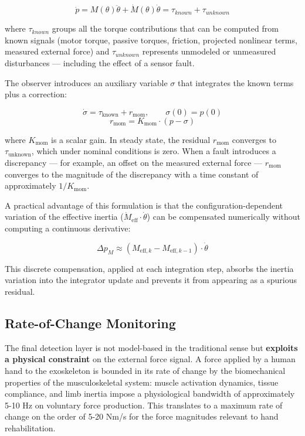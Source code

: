 \begin{equation}
    \dot{p} = M(\theta) \ddot{\theta} + \dot{M}(\theta) \dot{\theta} = \tau_{known} + \tau_{unknown}
\end{equation}

where $\tau_{known}$ groups all the torque contributions that can be computed from known signals (motor torque, passive torques, friction, projected nonlinear terms, measured external force) and $\tau_{unknown}$ represents unmodeled or unmeasured disturbances — including the effect of a sensor fault.

The observer introduces an auxiliary variable $\sigma$ that integrates the known terms plus a correction:

\begin{equation}
    \dot{\sigma} = \tau_{\text{known}} + r_{\text{mom}}, \qquad \sigma(0) = p(0)
\end{equation}
\begin{equation}
    r_{\text{mom}} = K_{\text{mom}} \cdot (p - \sigma)
\end{equation}

where $K_{\text{mom}}$ is a scalar gain. In steady state, the residual $r_{\text{mom}}$ converges to $\tau_{\text{unknown}}$, which under nominal conditions is zero. When a fault introduces a discrepancy — for example, an offset on the measured external force — $r_{\text{mom}}$ converges to the magnitude of the discrepancy with a time constant of approximately $1/K_{\text{mom}}$.

A practical advantage of this formulation is that the configuration-dependent variation of the effective inertia ($\dot{M}_{\text{eff}} \cdot \dot{\theta}$) can be compensated numerically without computing a continuous derivative:

\begin{equation}
    \Delta p_M \approx (M_{\text{eff},k} - M_{\text{eff},k-1}) \cdot \dot{\theta}
\end{equation}

This discrete compensation, applied at each integration step, absorbs the inertia variation into the integrator update and prevents it from appearing as a spurious residual.

\subsection{Rate-of-Change Monitoring}
The final detection layer is not model-based in the traditional sense but \textbf{exploits a physical constraint} on the external force signal. A force applied by a human hand to the exoskeleton is bounded in its rate of change by the biomechanical properties of the musculoskeletal system: muscle activation dynamics, tissue compliance, and limb inertia impose a physiological bandwidth of approximately 5-10 Hz on voluntary force production. This translates to a maximum rate of change on the order of 5-20 Nm/s for the force magnitudes relevant to hand rehabilitation.
 
